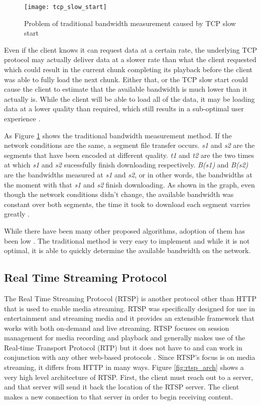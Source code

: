 \documentclass[12pt]{article}
\begin{document}
\begin{figure}[htb]
  \begin{center}
    \texttt{[image: tcp\_slow\_start]}
    \caption{Problem of traditional bandwidth measurement caused by TCP slow start}
    \label{fig:tcp_slow_start}
  \end{center}
\end{figure}

Even if the client knows it can request data at a certain rate, the underlying TCP protocol may actually deliver data at a slower rate than what the client requested which could result in the current chunk completing its playback before the client was able to fully load the next chunk.  Either that, or the TCP slow start could cause the client to estimate that the available bandwidth is much lower than it actually is.  While the client will be able to load all of the data, it may be loading data at a lower quality than required, which still results in a sub-optimal user experience \cite{7057917}.

As Figure \ref{fig:tcp_slow_start} shows the traditional bandwidth measurement method.  If the network conditions are the same, a segment file transfer occurs. \textit{s1} and \textit{s2} are the segments that have been encoded at different quality.  \textit{t1} and \textit{t2} are the two times at which \textit{s1} and \textit{s2} sucessfully finish downloading respectively. \textit{B(s1)} and \textit{B(s2)} are the bandwidths measured at \textit{s1} and \textit{s2}, or in other words, the bandwidths at the moment with that \textit{s1} and \textit{s2} finish downloading.  As shown in the graph, even though the network conditions didn't change, the available bandwidth was constant over both segments, the time it took to download each segment varries greatly \cite{7057917}.

While there have been many other proposed algorithms, adoption of them has been low \cite{6698072}\cite{7057917}.  The traditional method is very easy to implement and while it is not optimal, it is able to quickly determine the available bandwidth on the network.

\subsection{Real Time Streaming Protocol}
The Real Time Streaming Protocol (RTSP) is another protocol other than HTTP that is used to enable media streaming.  RTSP was specifically designed for use in entertainment and streaming media and it provides an extensible framework that works with both on-demand and live streaming.  RTSP focuses on session management for media recording and playback and generally makes use of the Real-time Transport Protocol (RTP) but it does not have to and can work in conjunction with any other web-based protocols \cite{rtsp_ieee}.  Since RTSP's focus is on media streaming, it differs from HTTP in many ways.  Figure \ref{fig:rtsp_arch} shows a very high level architecture of RTSP.  First, the client must reach out to a server, and that server will send it back the location of the RTSP server.  The client makes a new connection to that server in order to begin receiving content.
\end{document}
